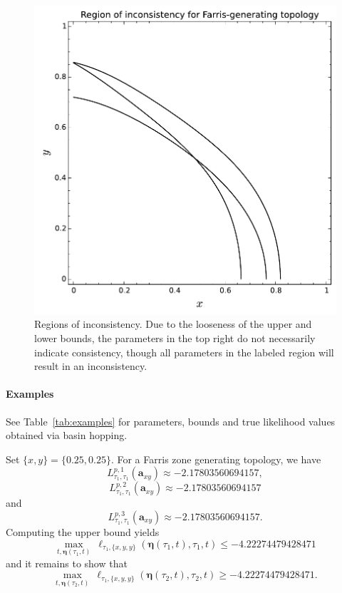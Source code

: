 \documentclass[a4paper]{article}
\newcommand{\fullAncestralSplitPartitions}{\boldsymbol\eta}
\begin{document}
\begin{figure}
\centering
\includegraphics[width=.9\textwidth]{analytic-inconsistency}
\caption{
    Regions of inconsistency.
    Due to the looseness of the upper and lower bounds, the parameters in the top right do not necessarily indicate consistency, though all parameters in the labeled region will result in an inconsistency.
}
\label{fig:inconsistency-farris}
\end{figure}

\paragraph{Examples}

See Table~\ref{tab:examples} for parameters, bounds and true likelihood values obtained via basin hopping.

Set $\{x, y\} = \{0.25, 0.25\}$.
For a Farris zone generating topology, we have
$$
L^{p,1}_{\tau_1,\tau_1}(\mathbf{a}_{xy}) \approx -2.17803560694157,
$$
$$
L^{p,2}_{\tau_1,\tau_1}(\mathbf{a}_{xy}) \approx -2.17803560694157
$$
and
$$
L^{p,3}_{\tau_1,\tau_1}(\mathbf{a}_{xy}) \approx -2.17803560694157.
$$
Computing the upper bound yields
$$
\max_{t,\fullAncestralSplitPartitions(\tau_1,t)} \ \ell_{\tau_1,\{x,y,y\}}(\fullAncestralSplitPartitions(\tau_1,t),\tau_1,t) \le -4.22274479428471
$$
and it remains to show that
$$
\max_{t,\fullAncestralSplitPartitions(\tau_2,t)} \ \ell_{\tau_1,\{x,y,y\}}(\fullAncestralSplitPartitions(\tau_2,t),\tau_2,t) \ge -4.22274479428471.
$$
\end{document}
